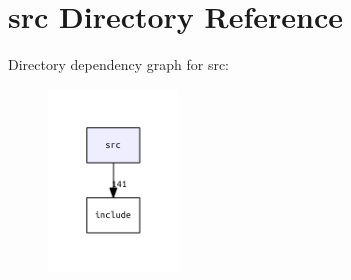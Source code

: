 \section{src Directory Reference}
\label{dir_68267d1309a1af8e8297ef4c3efbcdba}
Directory dependency graph for src\+:
\nopagebreak
\begin{figure}[H]
\begin{center}
\leavevmode
\includegraphics[width=98pt]{dir_68267d1309a1af8e8297ef4c3efbcdba_dep}
\end{center}
\end{figure}
